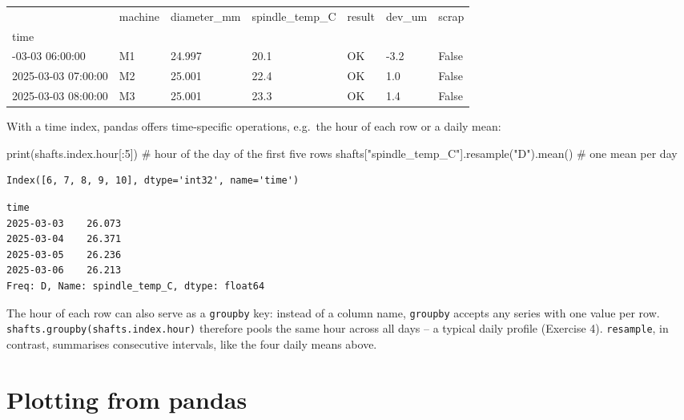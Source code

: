 \documentclass[
  letterpaper,
  DIV=11,
  numbers=noendperiod]{scrreprt}
\newenvironment{Shaded}{\begin{snugshade}}{\end{snugshade}}
\newcommand{\BuiltInTok}[1]{\textcolor[rgb]{0.00,0.23,0.31}{#1}}
\newcommand{\CommentTok}[1]{\textcolor[rgb]{0.37,0.37,0.37}{#1}}
\newcommand{\DecValTok}[1]{\textcolor[rgb]{0.68,0.00,0.00}{#1}}
\newcommand{\NormalTok}[1]{\textcolor[rgb]{0.00,0.23,0.31}{#1}}
\newcommand{\StringTok}[1]{\textcolor[rgb]{0.13,0.47,0.30}{#1}}
\begin{document}
\begin{longtable}[]{@{}lllllll@{}}
\toprule\noalign{}
& machine & diameter\_mm & spindle\_temp\_C & result & dev\_um &
scrap \\
time & & & & & & \\
\midrule\noalign{}
\endhead
\bottomrule\noalign{}
\endlastfoot
2025-03-03 06:00:00 & M1 & 24.997 & 20.1 & OK & -3.2 & False \\
2025-03-03 07:00:00 & M2 & 25.001 & 22.4 & OK & 1.0 & False \\
2025-03-03 08:00:00 & M3 & 25.001 & 23.3 & OK & 1.4 & False \\
\end{longtable}

With a time index, pandas offers time-specific operations, e.g.~the hour
of each row or a daily mean:

\begin{Shaded}
\begin{Highlighting}[]
\BuiltInTok{print}\NormalTok{(shafts.index.hour[:}\DecValTok{5}\NormalTok{])                          }\CommentTok{\# hour of the day of the first five rows}
\NormalTok{shafts[}\StringTok{"spindle\_temp\_C"}\NormalTok{].resample(}\StringTok{"D"}\NormalTok{).mean()         }\CommentTok{\# one mean per day}
\end{Highlighting}
\end{Shaded}

\begin{verbatim}
Index([6, 7, 8, 9, 10], dtype='int32', name='time')
\end{verbatim}

\begin{verbatim}
time
2025-03-03    26.073
2025-03-04    26.371
2025-03-05    26.236
2025-03-06    26.213
Freq: D, Name: spindle_temp_C, dtype: float64
\end{verbatim}

The hour of each row can also serve as a \texttt{groupby} key: instead
of a column name, \texttt{groupby} accepts any series with one value per
row. \texttt{shafts.groupby(shafts.index.hour)} therefore pools the same
hour across all days -- a typical daily profile (Exercise 4).
\texttt{resample}, in contrast, summarises consecutive intervals, like
the four daily means above.

\section*{Plotting from pandas}\label{plotting-from-pandas}
\end{document}
